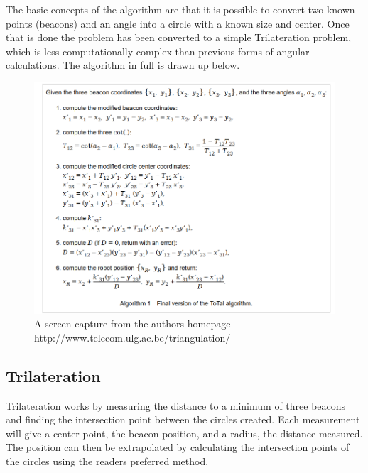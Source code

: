 The basic concepts of the algorithm are that it is possible to convert two known points (beacons) and an angle into a circle with a known size and center. Once that is done the problem has been converted to a simple Trilateration problem, which is less computationally complex than previous forms of angular calculations. The algorithm in full is drawn up below.

\begin{figure}
    \centering
    \includegraphics[width=0.4\linewidth]{positioning/positioning/ToTalAlgorithm}
    \caption{A screen capture from the authors homepage - http://www.telecom.ulg.ac.be/triangulation/}
    \label{fig:totalalgdrawing}
\end{figure}

\subsection{Trilateration}

Trilateration works by measuring the distance to a minimum of three beacons and finding the intersection point between the circles created. Each measurement will give a center point, the beacon position, and a radius, the distance measured. The position can then be extrapolated by calculating the intersection points of the circles using the readers preferred method.

